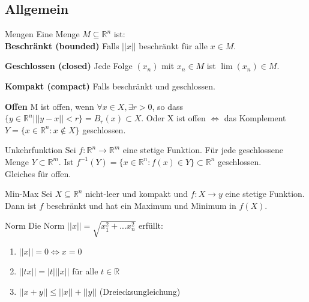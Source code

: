 \subsection{Allgemein}
\begin{Definition}{Mengen}{}
    Eine Menge $M \subseteq \mathbb{R}^n$ ist:\\
    \textbf{Beschränkt (bounded)} Falls $||x||$ beschränkt für alle $x \in M$.

    \textbf{Geschlossen (closed)} Jede Folge $(x_n)$ mit $x_n \in M$ ist $\lim (x_n) \in M$.

    \textbf{Kompakt (compact)} Falls beschränkt und geschlossen.

    \textbf{Offen} M ist offen, wenn $\forall x \in X, \exists r > 0$, so dass $\{y \in \mathbb{R}^n | ||y - x|| < r\} = B_r(x) \subset X$.
    Oder X ist offen $\iff$ das Komplement $Y = \{x \in \mathbb{R}^n: x \notin X\}$ geschlossen.

\end{Definition}

\begin{Satz}{Unkehrfunktion}{}
    Sei $f:\mathbb{R}^n \rightarrow \mathbb{R}^m$ eine stetige Funktion. Für jede geschlossene Menge $Y \subset \mathbb{R}^m$. Ist $f^{-1}(Y)=\{x\in\mathbb{R}^n : f(x) \in Y\} \subset \mathbb{R}^n $ geschlossen.\\
    Gleiches für offen.
\end{Satz}

\begin{Satz}{Min-Max}{}
    Sei $X \subseteq \mathbb{R}^n$ nicht-leer und kompakt und $f: X \rightarrow y$ eine stetige Funktion. Dann ist $f$ beschränkt und hat ein Maximum und Minimum in $f(X)$. 
\end{Satz}

\begin{Definition}{Norm}{}
    Die Norm $||x|| = \sqrt{x_1^2+...x_n^2}$ erfüllt:
    \begin{enumerate}
        \item $||x|| = 0 \Leftrightarrow x = 0$
        \item $||tx|| = |t|||x||$ für alle $t \in \mathbb{R}$
        \item $||x+y|| \leq ||x|| + ||y||$ (Dreiecksungleichung)
    \end{enumerate}
\end{Definition}

